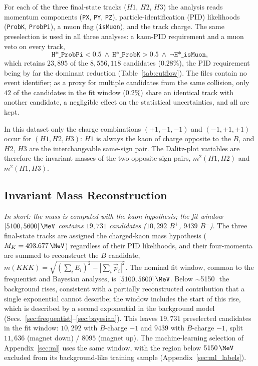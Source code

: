 For each of the three final-state tracks ($H1$, $H2$, $H3$) the analysis reads momentum components (\texttt{PX}, \texttt{PY}, \texttt{PZ}), particle-identification (PID) likelihoods (\texttt{ProbK}, \texttt{ProbPi}), a muon flag (\texttt{isMuon}), and the track charge. The same preselection is used in all three analyses: a kaon-PID requirement and a muon veto on every track,
\[
\texttt{H*\_ProbPi} < 0.5 \ \wedge\ \texttt{H*\_ProbK} > 0.5 \ \wedge\ \lnot\texttt{H*\_isMuon},
\]
which retains $23{,}895$ of the $8{,}556{,}118$ candidates ($0.28\%$), the PID requirement being by far the dominant reduction (Table~\ref{tab:cutflow}). The files contain no event identifier; as a proxy for multiple candidates from the same collision, only $42$ of the candidates in the fit window ($0.2\%$) share an identical track with another candidate, a negligible effect on the statistical uncertainties, and all are kept.

In this dataset only the charge combinations $(+1,-1,-1)$ and $(-1,+1,+1)$ occur for $(H1,H2,H3)$: $H1$ is always the kaon of charge opposite to the $B$, and $H2$, $H3$ are the interchangeable same-sign pair. The Dalitz-plot variables are therefore the invariant masses of the two opposite-sign pairs, $m^2(H1,H2)$ and $m^2(H1,H3)$.

\subsection{Invariant Mass Reconstruction}
\label{sec:data_mass}
\emph{In short: the mass is computed with the kaon hypothesis; the fit window $[5100,5600]\,\MeV$ contains $19{,}731$ candidates ($10{,}292$ $B^+$, $9439$ $B^-$).}
The three final-state tracks are assigned the charged-kaon mass hypothesis ($M_K=493.677\,\MeV$) regardless of their PID likelihoods, and their four-momenta are summed to reconstruct the $B$ candidate, $m(KKK)=\sqrt{(\sum_i E_i)^2-|\sum_i \vec{p}_i|^2}$. The nominal fit window, common to the frequentist and Bayesian analyses, is $[5100,5600]\,\MeV$. Below $\sim$5150\,\MeV\ the background rises, consistent with a partially reconstructed contribution that a single exponential cannot describe; the window includes the start of this rise, which is described by a second exponential in the background model (Secs.~\ref{sec:frequentist}--\ref{sec:bayesian}). This leaves $19{,}731$ preselected candidates in the fit window: $10{,}292$ with $B$-charge $+1$ and $9439$ with $B$-charge $-1$, split $11{,}636$ (magnet down) / $8095$ (magnet up). The machine-learning selection of Appendix~\ref{sec:ml} uses the same window, with the region below $5150\,\MeV$ excluded from its background-like training sample (Appendix~\ref{sec:ml_labels}).

